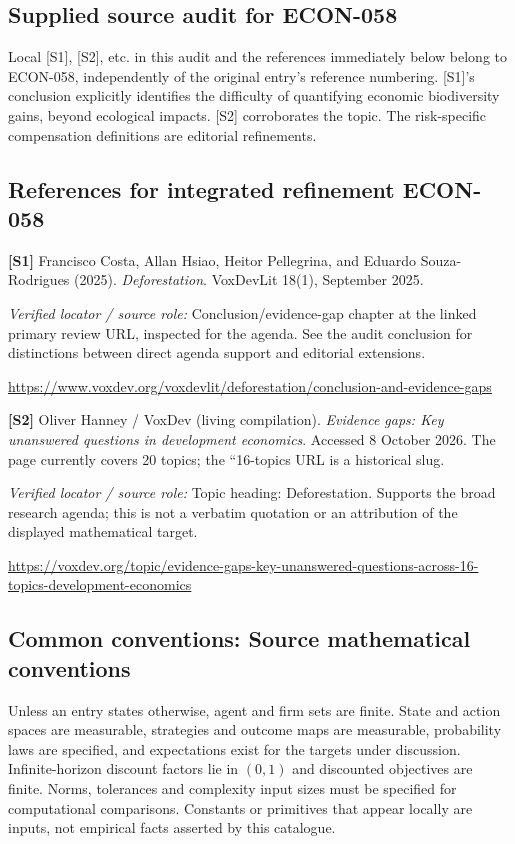 \documentclass[11pt,a4paper]{article}
\begin{document}
\subsection*{Supplied source audit for ECON-058}
Local [S1], [S2], etc. in this audit and the references immediately below
belong to ECON-058, independently of the original entry's reference numbering.
[S1]'s conclusion explicitly identifies the difficulty of quantifying economic biodiversity gains, beyond ecological impacts. [S2] corroborates the topic. The risk-specific compensation definitions are editorial refinements.
\subsection*{References for integrated refinement ECON-058}
{\footnotesize\raggedright
\par\noindent\textbf{[S1]} Francisco Costa, Allan Hsiao, Heitor Pellegrina, and Eduardo Souza-Rodrigues (2025). \emph{Deforestation}. VoxDevLit 18(1), September 2025.\par \textit{Verified locator / source role:} Conclusion/evidence-gap chapter at the linked primary review URL, inspected for the agenda. See the audit conclusion for distinctions between direct agenda support and editorial extensions.\par \url{https://www.voxdev.org/voxdevlit/deforestation/conclusion-and-evidence-gaps}\par\smallskip
\par\noindent\textbf{[S2]} Oliver Hanney / VoxDev (living compilation). \emph{Evidence gaps: Key unanswered questions in development economics}. Accessed 8 October 2026. The page currently covers 20 topics; the ``16-topics URL is a historical slug.\par \textit{Verified locator / source role:} Topic heading: Deforestation. Supports the broad research agenda; this is not a verbatim quotation or an attribution of the displayed mathematical target.\par \url{https://voxdev.org/topic/evidence-gaps-key-unanswered-questions-across-16-topics-development-economics}\par\smallskip
}

\subsection*{Common conventions: Source mathematical conventions}

Unless an entry states otherwise, agent and firm sets are finite. State and action spaces are measurable, strategies and outcome maps are measurable, probability laws are specified, and expectations exist for the targets under discussion. Infinite-horizon discount factors lie in $(0,1)$ and discounted objectives are finite. Norms, tolerances and complexity input sizes must be specified for computational comparisons. Constants or primitives that appear locally are inputs, not empirical facts asserted by this catalogue.
\end{document}
